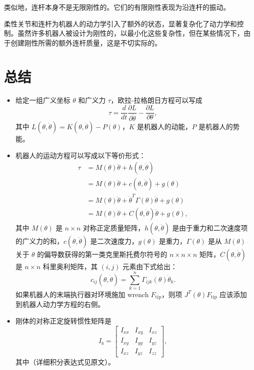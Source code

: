 \documentclass[12pt,a4paper]{article}
\begin{document}
类似地，连杆本身不是无限刚性的。它们的有限刚性表现为沿连杆的振动。

柔性关节和连杆为机器人的动力学引入了额外的状态，显著复杂化了动力学和控制。虽然许多机器人被设计为刚性的，以最小化这些复杂性，但在某些情况下，由于创建刚性所需的额外连杆质量，这是不切实际的。

\section{总结}
\begin{itemize}
\item 给定一组广义坐标 $\theta$ 和广义力 $\tau$，欧拉-拉格朗日方程可以写成
\begin{equation}
\tau = \frac{d}{dt}\frac{\partial L}{\partial \dot{\theta}} - \frac{\partial L}{\partial \theta},
\end{equation}
其中 $L(\theta, \dot{\theta}) = K(\theta, \dot{\theta}) - P(\theta)$，$K$ 是机器人的动能，$P$ 是机器人的势能。

\item 机器人的运动方程可以写成以下等价形式：
\begin{align}
\tau &= M(\theta)\ddot{\theta} + h(\theta, \dot{\theta}) \\
&= M(\theta)\ddot{\theta} + c(\theta, \dot{\theta}) + g(\theta) \\
&= M(\theta)\ddot{\theta} + \dot{\theta}^T \Gamma(\theta)\dot{\theta} + g(\theta) \\
&= M(\theta)\ddot{\theta} + C(\theta, \dot{\theta})\dot{\theta} + g(\theta),
\end{align}
其中 $M(\theta)$ 是 $n \times n$ 对称正定质量矩阵，$h(\theta, \dot{\theta})$ 是由于重力和二次速度项的广义力的和，$c(\theta, \dot{\theta})$ 是二次速度力，$g(\theta)$ 是重力，$\Gamma(\theta)$ 是从 $M(\theta)$ 关于 $\theta$ 的偏导数获得的第一类克里斯托费尔符号的 $n \times n \times n$ 矩阵，$C(\theta, \dot{\theta})$ 是 $n \times n$ 科里奥利矩阵，其 $(i, j)$ 元素由下式给出：
\begin{equation}
c_{ij}(\theta, \dot{\theta}) = \sum_{k=1}^{n} \Gamma_{ijk}(\theta)\dot{\theta}_k.
\end{equation}
如果机器人的末端执行器对环境施加 wrench $F_{\text{tip}}$，则项 $J^T(\theta)F_{\text{tip}}$ 应该添加到机器人动力学方程的右侧。

\item 刚体的对称正定旋转惯性矩阵是
\begin{equation}
I_b = \begin{bmatrix}
I_{xx} & I_{xy} & I_{xz} \\
I_{xy} & I_{yy} & I_{yz} \\
I_{xz} & I_{yz} & I_{zz}
\end{bmatrix},
\end{equation}
其中（详细积分表达式见原文）。


\end{itemize}
\end{document}
